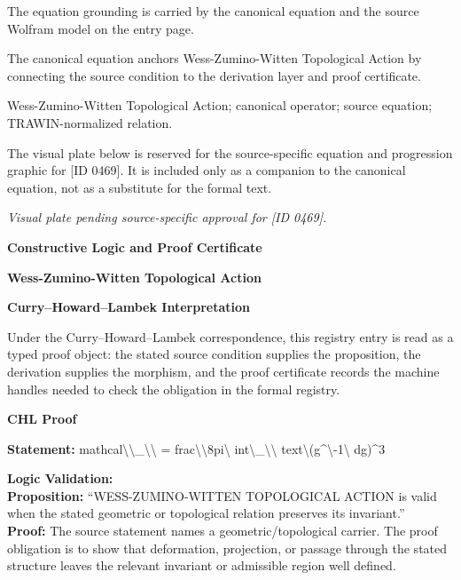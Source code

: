 The equation grounding is carried by the canonical equation and the source Wolfram model on the entry page.

The canonical equation anchors Wess-Zumino-Witten Topological Action by connecting the source condition to the derivation layer and proof certificate.

Wess-Zumino-Witten Topological Action; canonical operator; source equation; TRAWIN-normalized relation.
\endgroup

\begingroup\footnotesize\sloppy
The visual plate below is reserved for the source-specific equation and progression graphic for [ID 0469]. It is included only as a companion to the canonical equation, not as a substitute for the formal text.
\par\endgroup
\begingroup\footnotesize\itshape
Visual plate pending source-specific approval for [ID 0469].
\par\endgroup

\clearpage
\begingroup\tzpsupportsetup
\noindent\textbf{\fontsize{10.8pt}{12.8pt}\selectfont [ID 0469] Constructive Logic and Proof Certificate}\par
\noindent\textbf{\fontsize{10pt}{12pt}\selectfont Wess-Zumino-Witten Topological Action}\par
\vspace{0.45em}
\begingroup
\footnotesize
\setlength{\parskip}{0.22em}
\setlength{\parindent}{0pt}
\noindent\textbf{Curry--Howard--Lambek Interpretation}\par
Under the Curry--Howard--Lambek correspondence, this registry entry is read as a typed proof
object: the stated source condition supplies the proposition, the derivation supplies the
morphism, and the proof certificate records the machine handles needed to check the obligation
in the formal registry.

\vspace{0.45em}
\noindent\textbf{CHL Proof}\par
\textbf{Statement:} mathcal\textbackslash{}\textbackslash{}\_\textbackslash{}\textbackslash{} = frac\textbackslash{}\textbackslash{}8pi\textbackslash{} int\textbackslash{}\_\textbackslash{}\textbackslash{} text\textbackslash{}(g\textasciicircum{}\textbackslash{}-1\textbackslash{} dg)\textasciicircum{}3

\textbf{Logic Validation:}\\
\textbf{Proposition:} ``WESS-ZUMINO-WITTEN TOPOLOGICAL ACTION is valid when the stated geometric or topological
relation preserves its invariant.''\\
\textbf{Proof:} The source statement names a geometric/topological carrier. The proof obligation is to
show that deformation, projection, or passage through the stated structure leaves the
relevant invariant or admissible region well defined.

